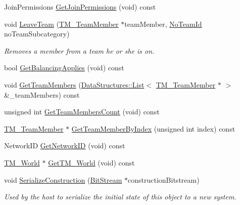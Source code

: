 \begin{DoxyCompactItemize}
Join\-Permissions \hyperlink{class_rak_net_1_1_t_m___team_a90ca145afac142885bb592e6f5edb33d}{Get\-Join\-Permissions} (void) const 
\item 
void \hyperlink{class_rak_net_1_1_t_m___team_a6bf18129be73f9083a68d8bb2d819d54}{Leave\-Team} (\hyperlink{class_rak_net_1_1_t_m___team_member}{T\-M\-\_\-\-Team\-Member} $\ast$team\-Member, \hyperlink{group___t_e_a_m___m_a_n_a_g_e_r___g_r_o_u_p_gadd1e99b7724ceb0f6794f46de31a6b02}{No\-Team\-Id} no\-Team\-Subcategory)
\begin{DoxyCompactList}\small\item\em Removes a member from a team he or she is on. \end{DoxyCompactList}\item 
bool \hyperlink{class_rak_net_1_1_t_m___team_a7ed675e6a384db5352cb47e5e086a626}{Get\-Balancing\-Applies} (void) const 
\item 
void \hyperlink{class_rak_net_1_1_t_m___team_a71637fd686bbb325cf1e3006278931ae}{Get\-Team\-Members} (\hyperlink{class_data_structures_1_1_list}{Data\-Structures\-::\-List}$<$ \hyperlink{class_rak_net_1_1_t_m___team_member}{T\-M\-\_\-\-Team\-Member} $\ast$ $>$ \&\-\_\-team\-Members) const 
\item 
unsigned int \hyperlink{class_rak_net_1_1_t_m___team_a8c3ac3a9b2e0de386756c4cf6687fa2a}{Get\-Team\-Members\-Count} (void) const 
\item 
\hyperlink{class_rak_net_1_1_t_m___team_member}{T\-M\-\_\-\-Team\-Member} $\ast$ \hyperlink{class_rak_net_1_1_t_m___team_ae10c0984e9b12b00e17eefe50760af67}{Get\-Team\-Member\-By\-Index} (unsigned int index) const 
\item 
Network\-I\-D \hyperlink{class_rak_net_1_1_t_m___team_a893303762f3cb2659fc0af0cac69bf2e}{Get\-Network\-I\-D} (void) const 
\item 
\hyperlink{class_rak_net_1_1_t_m___world}{T\-M\-\_\-\-World} $\ast$ \hyperlink{class_rak_net_1_1_t_m___team_a4b700230bd53ce3379acda1a108261aa}{Get\-T\-M\-\_\-\-World} (void) const 
\item 
void \hyperlink{class_rak_net_1_1_t_m___team_ab48e4f2b8324b0de9024788b987b079c}{Serialize\-Construction} (\hyperlink{class_rak_net_1_1_bit_stream}{Bit\-Stream} $\ast$construction\-Bitstream)
\begin{DoxyCompactList}\small\item\em Used by the host to serialize the initial state of this object to a new system. \end{DoxyCompactList}\item 

\end{DoxyCompactItemize}
